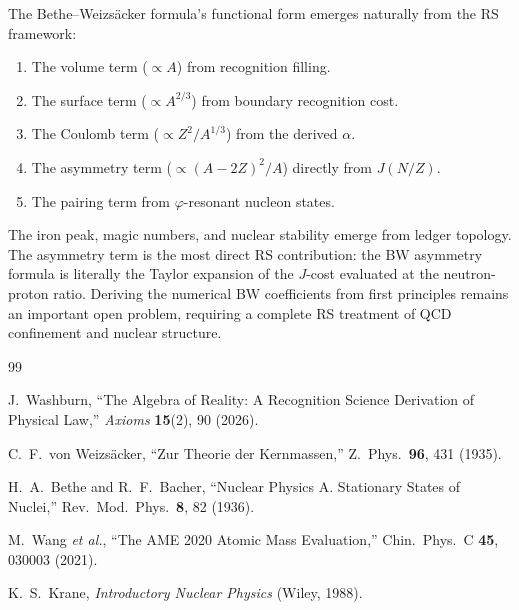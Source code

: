 \documentclass[12pt,a4paper]{article}
\theoremstyle{definition}
\theoremstyle{remark}
\begin{document}
The Bethe--Weizs\"acker formula's functional form emerges
naturally from the RS framework:
\begin{enumerate}
  \item The volume term ($\propto A$) from recognition filling.
  \item The surface term ($\propto A^{2/3}$) from boundary
  recognition cost.
  \item The Coulomb term ($\propto Z^2/A^{1/3}$) from the
  derived $\alpha$.
  \item The asymmetry term ($\propto (A-2Z)^2/A$) directly
  from $J(N/Z)$.
  \item The pairing term from $\varphi$-resonant nucleon
  states.
\end{enumerate}
The iron peak, magic numbers, and nuclear stability emerge
from ledger topology.  The asymmetry term is the most direct
RS contribution: the BW asymmetry formula is literally the
Taylor expansion of the $J$-cost evaluated at the
neutron-proton ratio.  Deriving the numerical BW coefficients
from first principles remains an important open problem,
requiring a complete RS treatment of QCD confinement and
nuclear structure.

\begin{thebibliography}{99}

J.~Washburn, ``The Algebra of Reality: A Recognition Science Derivation
of Physical Law,'' \emph{Axioms} \textbf{15}(2), 90 (2026).

C.~F.~von Weizs\"acker, ``Zur Theorie der Kernmassen,''
Z.\ Phys.\ \textbf{96}, 431 (1935).

H.~A.~Bethe and R.~F.~Bacher, ``Nuclear Physics A.
Stationary States of Nuclei,'' Rev.\ Mod.\ Phys.\
\textbf{8}, 82 (1936).

M.~Wang \textit{et al.}, ``The AME 2020 Atomic Mass
Evaluation,'' Chin.\ Phys.\ C \textbf{45}, 030003 (2021).

K.~S.~Krane, \textit{Introductory Nuclear Physics}
(Wiley, 1988).

\end{thebibliography}
\end{document}
